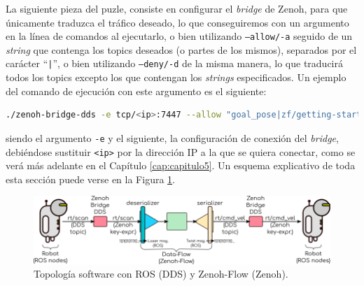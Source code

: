 La siguiente pieza del puzle, consiste en configurar el \textit{bridge} de
Zenoh, para que únicamente traduzca el tráfico deseado, lo que conseguiremos con
un argumento en la línea de comandos al ejecutarlo, o bien utilizando
\texttt{--allow/-a} seguido de un \textit{string} que contenga los topics
deseados (o partes de los mismos), separados por el carácter ``\texttt{|}'', o
bien utilizando \texttt{--deny/-d} de la misma manera, lo que traducirá todos
los topics excepto los que contengan los \textit{strings} especificados.
Un ejemplo del comando de ejecución con este argumento es el siguiente:
\begin{lstlisting}[language=bash]
  ./zenoh-bridge-dds -e tcp/<ip>:7447 --allow "goal_pose|zf/getting-started/"
\end{lstlisting}
siendo el argumento \texttt{-e} y el siguiente, la configuración de conexión del
\textit{bridge}, debiéndose sustituir \verb|<ip>| por la dirección IP a la que
se quiera conectar, como se verá más adelante en el Capítulo
\ref{cap:capitulo5}.
Un esquema explicativo de toda esta sección puede verse en la Figura
\ref{fig:zenoh_dds_topology}.
\\

\begin{figure} [h!]
  \begin{center}
    \includegraphics[width=15cm]{figs/zenoh_dds_topology}
  \end{center}
  \caption{Topología software con ROS (DDS) y Zenoh-Flow (Zenoh).}
  \label{fig:zenoh_dds_topology}
\end{figure}\











